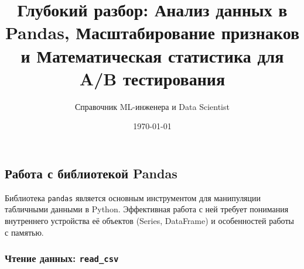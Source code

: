 \documentclass[12pt]{article}
\begin{document}
\title{\textbf{Глубокий разбор: Анализ данных в Pandas, Масштабирование признаков и Математическая статистика для A/B тестирования}}
\author{Справочник ML-инженера и Data Scientist}
\date{\today}
\maketitle

\tableofcontents
\newpage

\subsection{Работа с библиотекой Pandas}

Библиотека \texttt{pandas} является основным инструментом для манипуляции табличными данными в Python. Эффективная работа с ней требует понимания внутреннего устройства её объектов (Series, DataFrame) и особенностей работы с памятью.

\subsubsection{Чтение данных: \texttt{read\_csv}}
\end{document}
